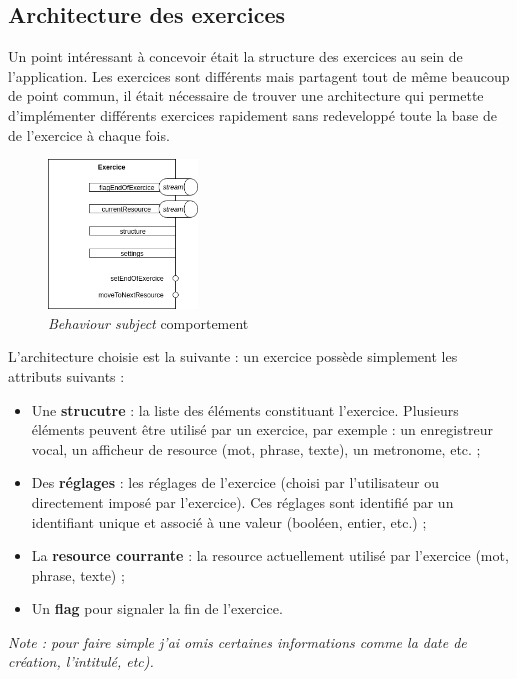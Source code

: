 \subsection{Architecture des exercices}

Un point intéressant à concevoir était la structure des exercices au sein de l'application. Les exercices sont différents mais partagent tout de même beaucoup de point commun, il était nécessaire de trouver une architecture qui permette d'implémenter différents exercices rapidement sans redeveloppé toute la base de de l'exercice à chaque fois.

\begin{figure}[H]
  \includegraphics[width=150px]{content/imgs/exercice.png}
  \caption{\textit{Behaviour subject} comportement}
  \label{fig:exercice}
\end{figure}

L'architecture choisie est la suivante : un exercice possède simplement les attributs suivants :

\begin{itemize}
  \item Une \textbf{strucutre} : la liste des éléments constituant l'exercice. Plusieurs éléments peuvent être utilisé par un exercice, par exemple : un enregistreur vocal, un afficheur de resource (mot, phrase, texte), un metronome, etc. ;
  \item Des \textbf{réglages} : les réglages de l'exercice (choisi par l'utilisateur ou directement imposé par l'exercice). Ces réglages sont identifié par un identifiant unique et associé à une valeur (booléen, entier, etc.) ;
  \item La \textbf{resource courrante} : la resource actuellement utilisé par l'exercice (mot, phrase, texte) ;
  \item Un \textbf{flag} pour signaler la fin de l'exercice.
\end{itemize}

\textit{Note : pour faire simple j'ai omis certaines informations comme la date de création, l'intitulé, etc).}


